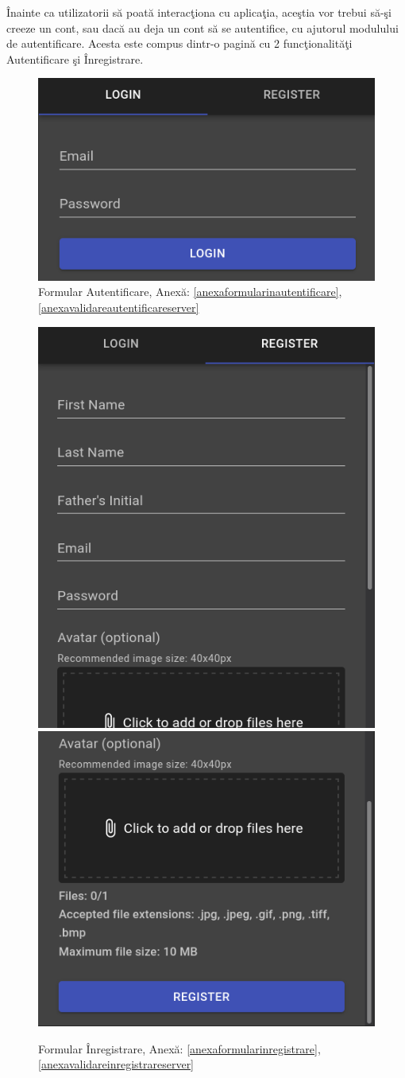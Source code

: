 \documentclass[12pt, a4paper, oneside, romanian]{teza-upb}
\begin{document}
Înainte ca utilizatorii să poată interacţiona cu aplicaţia, aceştia vor trebui să-şi creeze un cont, sau dacă au deja un cont să se autentifice, cu ajutorul modulului de autentificare. Acesta este compus dintr-o pagină cu 2 funcţionalităţi Autentificare şi Înregistrare.

\begin{figure}[H]
\centering
\includegraphics*[width=0.5\columnwidth]{auth-login}
\caption{Formular Autentificare, Anexă: \ref{anexaformularinautentificare}, \ref{anexavalidareautentificareserver}}
\label{formular-autentificare}
\end{figure}

\begin{figure}[H]
\centering
\includegraphics*[width=0.45\columnwidth]{auth-register1}
\includegraphics*[width=0.45\columnwidth]{auth-register2}
\caption{Formular Înregistrare, Anexă: \ref{anexaformularinregistrare}, \ref{anexavalidareinregistrareserver}}
\label{formular-inregistrare}
\end{figure}
\end{document}
